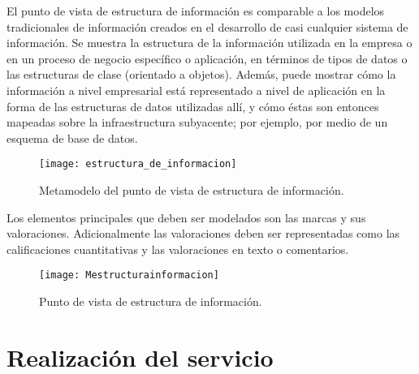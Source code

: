 El punto de vista de estructura de información es comparable a los modelos tradicionales de información creados en el desarrollo de casi cualquier sistema de información. Se muestra la estructura de la información utilizada en la empresa o en un proceso de negocio específico o aplicación, en términos de tipos de datos o las estructuras de clase (orientado a objetos). 
Además, puede mostrar cómo la información a nivel empresarial está representado a nivel de aplicación en la forma de las estructuras de datos utilizadas allí, y cómo éstas son entonces mapeadas sobre la infraestructura subyacente; por ejemplo, por medio de un esquema de base de datos.

\begin{figure}[H]
\centering
\texttt{[image: estructura\_de\_informacion]}
\caption{Metamodelo del punto de vista de estructura de información.}
\end{figure}
Los elementos principales que deben ser modelados son las marcas y sus valoraciones. Adicionalmente las valoraciones deben ser representadas como las calificaciones cuantitativas y las valoraciones en texto o comentarios.

\begin{figure}[H]
\centering
\texttt{[image: Mestructurainformacion]}
\caption{Punto de vista de estructura de información.}
\end{figure}

\section{Realización del servicio}



